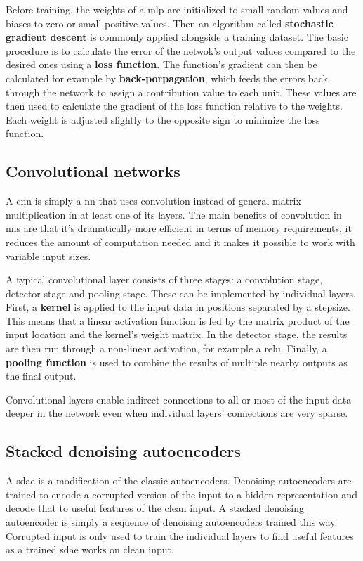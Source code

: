 Before training, the weights of a \ac{mlp} are initialized to small random values and 
biases to zero or small positive values. Then an algorithm called \textbf{stochastic
gradient descent} is commonly applied alongside a training dataset. The basic procedure
is to calculate the error of the netwok's output values compared to the desired ones 
using a \textbf{loss function}. The function's gradient can then be calculated for
example by \textbf{back-porpagation}, which feeds the errors back through the network
to assign a contribution value to each unit. These values are then used to calculate
the gradient of the loss function relative to the weights. Each weight is adjusted
slightly to the opposite sign to minimize the loss function.

\subsection{Convolutional networks}

A \ac{cnn} is simply a \ac{nn} that uses convolution instead of general matrix
multiplication in at least one of its layers. The main benefits of convolution in \ac{nn}s
are that it's dramatically more efficient in terms of memory requirements, it reduces
the amount of computation needed and it makes it possible to work with variable input
sizes.

A typical convolutional layer consists of three stages: a convolution stage, detector
stage and pooling stage. These can be implemented by individual layers. First, a
\textbf{kernel} is applied to the input data in positions separated by a stepsize. This
means that a linear activation function is fed by the matrix product of the input location
and the kernel's weight matrix. In the detector stage, the results are then run through
a non-linear activation, for example a \ac{relu}. Finally, a \textbf{pooling function}
is used to combine the results of multiple nearby outputs as the final output.

Convolutional layers enable indirect connections to all or most of the input data deeper
in the network even when individual layers' connections are very sparse.

\subsection{Stacked denoising autoencoders}
A \ac{sdae} is a modification of the classic autoencoders. Denoising autoencoders
are trained to encode a corrupted version of the input to a hidden representation
and decode that to useful features of the clean input. A stacked denoising autoencoder
is simply a sequence of denoising autoencoders trained this way. Corrupted input
is only used to train the individual layers to find useful features as a trained
\ac{sdae} works on clean input.~\cite{SDAE}
